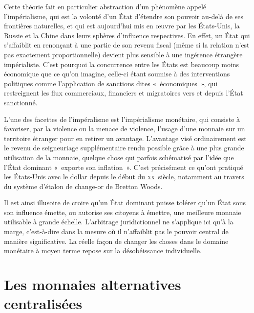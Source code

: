 Cette théorie fait en particulier abstraction d'un phénomène appelé l'impérialisme, qui est la volonté d'un État d'étendre son pouvoir au-delà de ses frontières naturelles, et qui est aujourd'hui mis en œuvre par les États-Unis, la Russie et la Chine dans leurs sphères d'influence respectives. En effet, un État qui s'affaiblit en renonçant à une partie de son revenu fiscal (même si la relation n'est pas exactement proportionnelle) devient plus sensible à une ingérence étrangère impérialiste. C'est pourquoi la concurrence entre les États est beaucoup moins économique que ce qu'on imagine, celle-ci étant soumise à des interventions politiques comme l'application de sanctions dites «~économiques~», qui restreignent les flux commerciaux, financiers et migratoires vers et depuis l'État sanctionné.

L'une des facettes de l'impéralisme est l'impérialisme monétaire, qui consiste à favoriser, par la violence ou la menace de violence, l'usage d'une monnaie sur un territoire étranger pour en retirer un avantage. L'avantage visé ordinairement est le revenu de seigneuriage supplémentaire rendu possible grâce à une plus grande utilisation de la monnaie, quelque chose qui parfois schématisé par l'idée que l'État dominant «~exporte son inflation~». C'est précisément ce qu'ont pratiqué les États-Unis avec le dollar depuis le début du \textsc{xx}\ieme{}~siècle, notamment au travers du système d'étalon de change-or de Bretton Woods. %

Il est ainsi illusoire de croire qu'un État dominant puisse tolérer qu'un État sous son influence émette, ou autorise ses citoyens à émettre, une meilleure monnaie utilisable à grande échelle. L'arbitrage juridictionnel ne s'applique ici qu'à la marge, c'est-à-dire dans la mesure où il n'affaiblit pas le pouvoir central de manière significative. La réelle façon de changer les choses dans le domaine monétaire à moyen terme repose sur la désobéissance individuelle.

\section*{Les monnaies alternatives centralisées}

